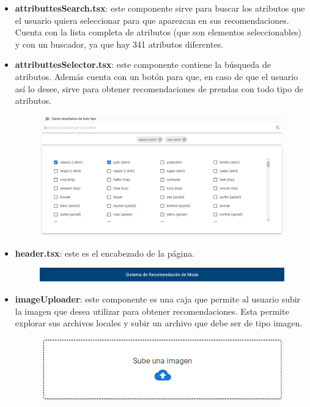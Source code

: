 \documentclass[12pt]{report} %
\begin{document}
	\begin{itemize}
		\item \textbf{attributtesSearch.tsx}: este componente sirve para buscar los atributos que el usuario quiera
		seleccionar para que aparezcan en sus recomendaciones. Cuenta con la lista completa de atributos (que son elementos
		seleccionables) y con un buscador, ya que hay 341 atributos diferentes.
		\item \textbf{attributtesSelector.tsx}: este componente contiene la búsqueda de atributos. 
		Además cuenta con un botón para que, en caso de que el usuario así lo desee, 
		sirve para obtener recomendaciones de prendas con todo tipo de atributos.
		\begin{figure}[H]
			{\includegraphics[scale=0.4]{attributes-search.png}}
		\end{figure}
		\item \textbf{header.tsx}: este es el encabezado de la página.
		\begin{figure}[H]
			{\includegraphics[scale=0.3]{header.png}}
		\end{figure}
		\item \textbf{imageUploader}: este componente es una caja que permite al usuario subir la imagen que
		desea utilizar para obtener recomendaciones. Esta permite explorar sus archivos locales y subir un
		archivo que debe ser de tipo imagen.
		\begin{figure}[H]
			{\includegraphics[scale=0.7]{image-uploader.png}}

\end{figure}
\end{itemize}
\end{document}
